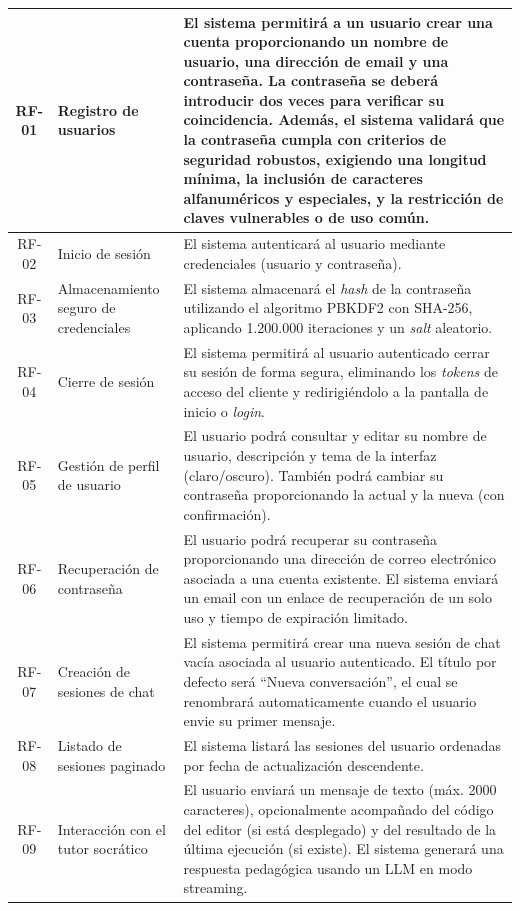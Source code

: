 \begin{longtable}{|c|p{3.5cm}|p{9cm}|}
  \rowcolor{ulepsbased} RF-01 & Registro de usuarios & El sistema permitirá a un usuario crear una cuenta proporcionando un nombre de usuario, una dirección de email y una contraseña. La contraseña se deberá introducir dos veces para verificar su coincidencia. Además, el sistema validará que la contraseña cumpla con criterios de seguridad robustos, exigiendo una longitud mínima, la inclusión de caracteres alfanuméricos y especiales, y la restricción de claves vulnerables o de uso común. \\ \hline
  RF-02 & Inicio de sesión & El sistema autenticará al usuario mediante credenciales (usuario y contraseña). \\ \hline
  \rowcolor{ulepsbased} RF-03 & Almacenamiento seguro de credenciales & El sistema almacenará el \textit{hash} de la contraseña utilizando el algoritmo PBKDF2 con SHA-256, aplicando 1.200.000 iteraciones y un \textit{salt} aleatorio. \\ \hline
  RF-04 & Cierre de sesión & El sistema permitirá al usuario autenticado cerrar su sesión de forma segura, eliminando los \textit{tokens} de acceso del cliente y redirigiéndolo a la pantalla de inicio o \textit{login}. \\ \hline
  \rowcolor{ulepsbased} RF-05 & Gestión de perfil de usuario & El usuario podrá consultar y editar su nombre de usuario, descripción y tema de la interfaz (claro/oscuro). También podrá cambiar su contraseña proporcionando la actual y la nueva (con confirmación). \\ \hline
  RF-06 & Recuperación de contraseña & El usuario podrá recuperar su contraseña proporcionando una dirección de correo electrónico asociada a una cuenta existente. El sistema enviará un email con un enlace de recuperación de un solo uso y tiempo de expiración limitado. \\ \hline
  \rowcolor{ulepsbased} RF-07 & Creación de sesiones de chat & El sistema permitirá crear una nueva sesión de chat vacía asociada al usuario autenticado. El título por defecto será ``Nueva conversación'', el cual se renombrará automaticamente cuando el usuario envie su primer mensaje. \\ \hline
  RF-08 & Listado de sesiones paginado & El sistema listará las sesiones del usuario ordenadas por fecha de actualización descendente. \\ \hline
  \rowcolor{ulepsbased} RF-09 & Interacción con el tutor socrático & El usuario enviará un mensaje de texto (máx. 2000 caracteres), opcionalmente acompañado del código del editor (si está desplegado) y del resultado de la última ejecución (si existe). El sistema generará una respuesta pedagógica usando un LLM en modo streaming. \\ \hline

\end{longtable}
